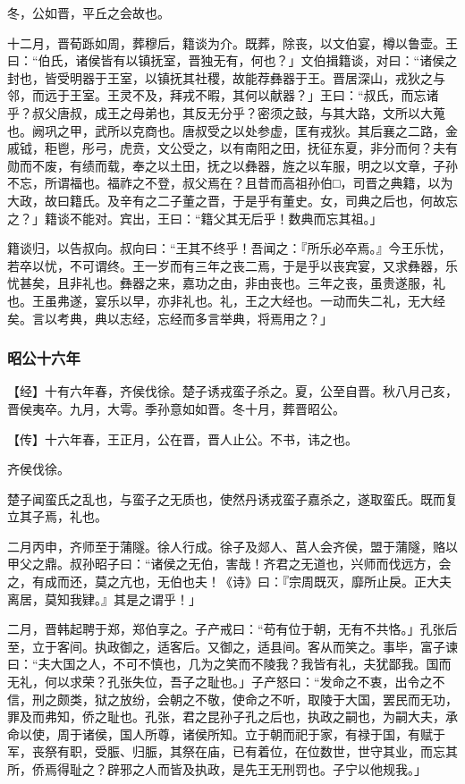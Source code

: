 \documentclass[]{article}
\begin{document}
冬，公如晋，平丘之会故也。

十二月，晋荀跞如周，葬穆后，籍谈为介。既葬，除丧，以文伯宴，樽以鲁壶。王曰：``伯氏，诸侯皆有以镇抚室，晋独无有，何也？」文伯揖籍谈，对曰：``诸侯之封也，皆受明器于王室，以镇抚其社稷，故能荐彝器于王。晋居深山，戎狄之与邻，而远于王室。王灵不及，拜戎不暇，其何以献器？」王曰：``叔氏，而忘诸乎？叔父唐叔，成王之母弟也，其反无分乎？密须之鼓，与其大路，文所以大蒐也。阙巩之甲，武所以克商也。唐叔受之以处参虚，匡有戎狄。其后襄之二路，金戚钺，秬鬯，彤弓，虎贲，文公受之，以有南阳之田，抚征东夏，非分而何？夫有勋而不废，有绩而载，奉之以土田，抚之以彝器，旌之以车服，明之以文章，子孙不忘，所谓福也。福祚之不登，叔父焉在？且昔而高祖孙伯□，司晋之典籍，以为大政，故曰籍氏。及辛有之二子董之晋，于是乎有董史。女，司典之后也，何故忘之？」籍谈不能对。宾出，王曰：``籍父其无后乎！数典而忘其祖。」

籍谈归，以告叔向。叔向曰：``王其不终乎！吾闻之：『所乐必卒焉。』今王乐忧，若卒以忧，不可谓终。王一岁而有三年之丧二焉，于是乎以丧宾宴，又求彝器，乐忧甚矣，且非礼也。彝器之来，嘉功之由，非由丧也。三年之丧，虽贵遂服，礼也。王虽弗遂，宴乐以早，亦非礼也。礼，王之大经也。一动而失二礼，无大经矣。言以考典，典以志经，忘经而多言举典，将焉用之？」

\hypertarget{header-n2632}{%
\subsubsection{昭公十六年}\label{header-n2632}}

【经】十有六年春，齐侯伐徐。楚子诱戎蛮子杀之。夏，公至自晋。秋八月己亥，晋侯夷卒。九月，大雩。季孙意如如晋。冬十月，葬晋昭公。

【传】十六年春，王正月，公在晋，晋人止公。不书，讳之也。

齐侯伐徐。

楚子闻蛮氏之乱也，与蛮子之无质也，使然丹诱戎蛮子嘉杀之，遂取蛮氏。既而复立其子焉，礼也。

二月丙申，齐师至于蒲隧。徐人行成。徐子及郯人、莒人会齐侯，盟于蒲隧，赂以甲父之鼎。叔孙昭子曰：``诸侯之无伯，害哉！齐君之无道也，兴师而伐远方，会之，有成而还，莫之亢也，无伯也夫！《诗》曰：『宗周既灭，靡所止戾。正大夫离居，莫知我肄。』其是之谓乎！」

二月，晋韩起聘于郑，郑伯享之。子产戒曰：``苟有位于朝，无有不共恪。」孔张后至，立于客间。执政御之，适客后。又御之，适县间。客从而笑之。事毕，富子谏曰：``夫大国之人，不可不慎也，几为之笑而不陵我？我皆有礼，夫犹鄙我。国而无礼，何以求荣？孔张失位，吾子之耻也。」子产怒曰：``发命之不衷，出令之不信，刑之颇类，狱之放纷，会朝之不敬，使命之不听，取陵于大国，罢民而无功，罪及而弗知，侨之耻也。孔张，君之昆孙子孔之后也，执政之嗣也，为嗣大夫，承命以使，周于诸侯，国人所尊，诸侯所知。立于朝而祀于家，有禄于国，有赋于军，丧祭有职，受脤、归脤，其祭在庙，已有着位，在位数世，世守其业，而忘其所，侨焉得耻之？辟邪之人而皆及执政，是先王无刑罚也。子宁以他规我。」
\end{document}
